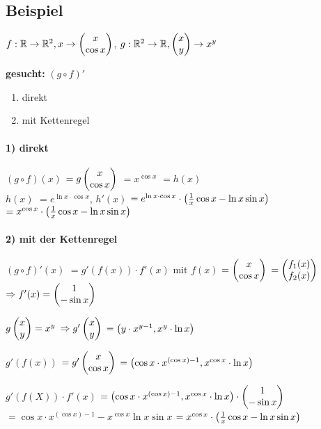 \renewcommand{\ldate}{2015-11-12}

\subsection{Beispiel}
$ f: \mathbb{R} \rightarrow \mathbb{R}^2, x \rightarrow  \begin{pmatrix} x \\ \cos x \end{pmatrix} $, 
$ g: \mathbb{R}^2 \rightarrow \mathbb{R},  \begin{pmatrix} x\\y \end{pmatrix} \rightarrow x^y$

\textbf{gesucht:} $(g\circ f)'$
\begin{enumerate}
\item direkt
\item mit Kettenregel
\end{enumerate}

\paragraph{1) direkt} 
$ (g\circ f)(x) $
$= g \begin{pmatrix} x\\ \cos x \end{pmatrix}  $
$=x^{\cos x}$
$=h(x)$\\
$h(x) $
$= e^{\ln x \cdot \cos x}$, 
$h'(x) $
$= e^{\ln x \cdot \cos x} \cdot  \left( \frac{1}{x} \cos x - \ln x \sin x \right) $
$=x^{\cos x} \cdot   \left( \frac{1}{x} \cos x - \ln x \sin x \right) $

\paragraph{2) mit der Kettenregel}
$(g\circ f)'(x)$
$=g'(f(x)) \cdot f'(x)$
mit $f(x) $
$=  \begin{pmatrix} x\\\cos x \end{pmatrix} $
$=  \begin{pmatrix} f_1(x)\\f_2(x) \end{pmatrix} $
$\Rightarrow f'(x) =  \begin{pmatrix} 1\\-\sin x \end{pmatrix} $

$g \begin{pmatrix} x\\y \end{pmatrix} =x^y$
$\Rightarrow g' \begin{pmatrix} x\\y \end{pmatrix} $
$= \left( y\cdot x^{y-1}, x^y\cdot \ln x \right) $

$g'(f(x)) $
$=g' \begin{pmatrix} x\\\cos x \end{pmatrix} $
$= \left( \cos x\cdot x^{(\cos x)-1}, x^{\cos x} \cdot \ln x \right) $

$g'(f(X)) \cdot f'(x)$
$= \left( \cos x\cdot x^{(\cos x)-1}, x^{\cos x} \cdot \ln x \right)  \cdot  \begin{pmatrix} 1\\-\sin x \end{pmatrix} $
$=\cos x\cdot x^{(\cos x)-1} - x^{\cos x} \ln x \sin x $
$=x^{\cos x} \cdot   \left( \frac{1}{x} \cos x - \ln x \sin x \right) $

